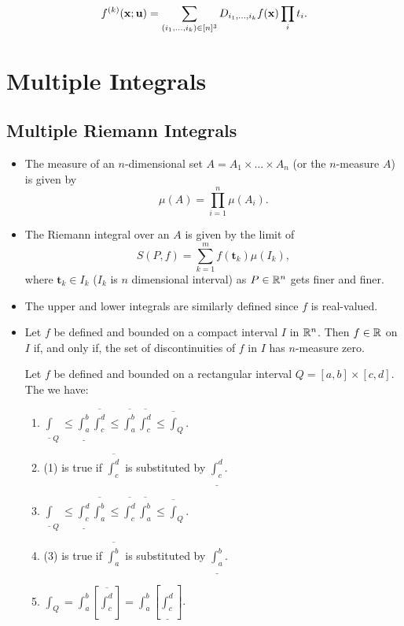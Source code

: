 \documentclass[10pt,a4paper]{book}
\begin{document}
\begin{deff}
$$f^{(k)}(\mathbf{x};\mathbf{u}) = \sum_{(i_1, \dots,  i_k) \in [n]^3 } D_{i_1, \dots, i_k}f(\mathbf{x})\prod_{i}t_i.$$
\end{deff}



\chapter{Multiple Integrals}
\section*{Multiple Riemann Integrals}
\begin{itemize}
    \item The measure of an $n$-dimensional set $A = A_1 \times \dots \times A_n$ (or the $n$-measure $A$) is given by
$$\mu(A) = \prod_{i=1}^{n}\mu(A_i).$$
\item The Riemann integral over an $A$ is given by the limit of 
$$S(P, f) = \sum_{k = 1}^m f(\mathbf{t}_k)\mu(I_k),$$
where $\mathbf{t}_k \in I_k$ ($I_k $ is $n$ dimensional interval) as $P \in \mathbb{R}^n$ gets finer and finer.
\item The upper and lower integrals are similarly defined since $f$ is real-valued.
\item Let $f$ be defined and bounded on a compact interval $I$ in $\mathbb{R}^n$. Then $f \in \mathbb{R}$ on $I$ if, and only if, the set of discontinuities of $f$ in $I$ has $n$-measure zero.
\begin{Thm}
    Let $f$ be defined and bounded on a rectangular interval $Q = [a,b]\times [c,d].$ The we have:
    \begin{enumerate}
        \item $\underline{\int}_Q \leq \underline{\int_a^b} \overline{\int_c^d} \leq \overline{\int_a^b} \overline{\int_c^d }\leq \overline{\int}_Q. $
        \item (1) is true if $\overline{\int_c^d }$ is substituted by $\underline{\int_c^d }.$ 
        \item $\underline{\int}_Q \leq \underline{\int_c^d} \overline{\int_a^b} \leq \overline{\int_c^d} \overline{\int_a^b }\leq \overline{\int}_Q.$
                \item (3) is true if $\overline{\int_a^b }$ is substituted by $\underline{\int_a^b }.$ 
        \item $\int_Q = \int_a^b [\overline{\int_c^d}] = \int_a^b [\underline{\int_c^d}]$.        


\end{enumerate}
\end{Thm}
\end{itemize}
\end{document}
